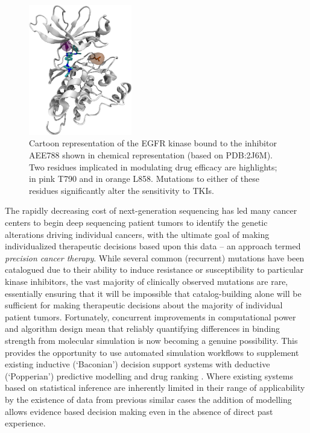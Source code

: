 \begin{figure}[!htbp]
  \centering
  \includegraphics[width=0.4\textwidth]{FIGURES/egfr.png}
  \caption{Cartoon representation of the EGFR kinase bound to the inhibitor AEE788 shown in chemical representation (based on PDB:2J6M). 
  Two residues implicated in modulating drug efficacy are highlights; in pink T790 and in orange L858. 
  Mutations to either of these residues significantly alter the sensitivity to TKIs.
           }\label{fig:egfr}
\end{figure}

The rapidly decreasing cost of next-generation sequencing has led many cancer centers to begin deep sequencing patient tumors to identify the genetic alterations driving individual cancers, with the ultimate goal of making individualized therapeutic decisions based upon this data -- an approach termed \textit{precision cancer therapy}.
While several common (recurrent) mutations have been catalogued due to their ability to induce resistance or susceptibility to particular kinase inhibitors, the vast majority of clinically observed mutations are rare, essentially ensuring that it will be impossible that catalog-building alone will be sufficient for making therapeutic decisions about the majority of individual patient tumors.
Fortunately, concurrent improvements in computational power and algorithm design mean that reliably quantifying differences in binding strength from molecular simulation is now becoming a genuine possibility.
This provides the opportunity to use automated simulation workflows to supplement existing inductive (`Baconian') decision support systems with deductive (`Popperian') predictive modelling and drug ranking \cite{Marias2011, Sloot2009}.
Where existing systems based on statistical inference are inherently limited in their range of applicability by the existence of data from previous similar cases the addition of modelling allows evidence based decision making even in the absence of direct past experience.

